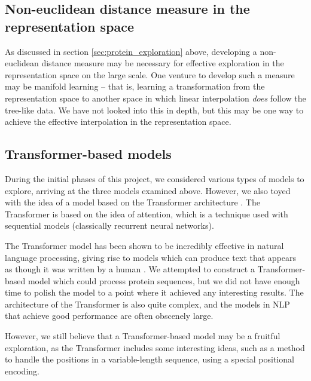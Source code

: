 
\subsection{Non-euclidean distance measure in the representation space}
As discussed in section \ref{sec:protein_exploration} above, developing a non-euclidean distance measure may be necessary for effective exploration in the representation space on the large scale. One venture to develop such a measure may be manifold learning -- that is, learning a transformation from the representation space to another space in which linear interpolation \textit{does} follow the tree-like data. We have not looked into this in depth, but this may be one way to achieve the effective interpolation in the representation space.


\subsection{Transformer-based models}
During the initial phases of this project, we considered various types of models to explore, arriving at the three models examined above. However, we also toyed with the idea of a model based on the Transformer architecture \cite{vaswani2017attention}. The Transformer is based on the idea of attention, which is a technique used with sequential models (classically recurrent neural networks). 

The Transformer model has been shown to be incredibly effective in natural language processing, giving rise to models which can produce text that appears as though it was written by a human \cite{radford2019language}. We attempted to construct a Transformer-based model which could process protein sequences, but we did not have enough time to polish the model to a point where it achieved any interesting results. The architecture of the Transformer is also quite complex, and the models in NLP that achieve good performance are often obscenely large.

However, we still believe that a Transformer-based model may be a fruitful exploration, as the Transformer includes some interesting ideas, such as a method to handle the positions in a variable-length sequence, using a special positional encoding.

